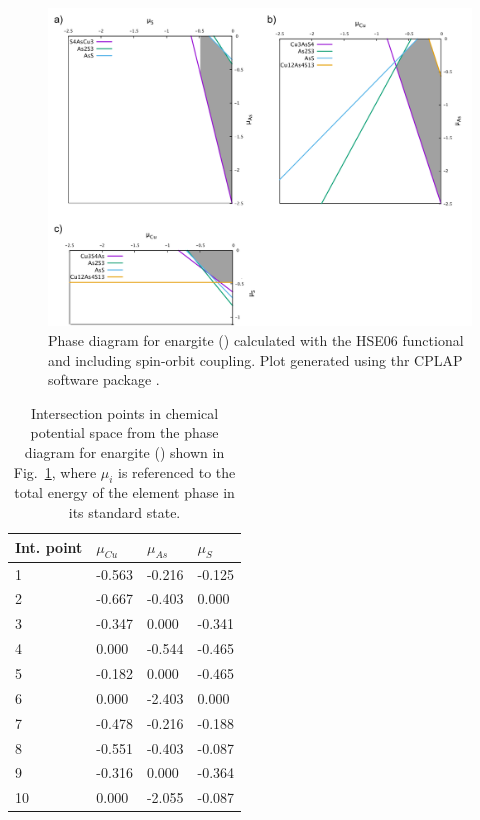 \documentclass[11pt, twoside]{report}
\begin{document}
\begin{figure}[h!]
    \centering
    \includegraphics[width=1.0\textwidth]{figures/enargite_p_d.png}
    \caption[Phase diagram for enargite ({\enargite}) calculated with the HSE06 functional and including spin-orbit coupling.]{Phase diagram for enargite ({\enargite}) calculated with the HSE06 functional and including spin-orbit coupling. Plot generated using thr CPLAP software package \cite{cplap}.}
    \label{enargite_p_d}
\end{figure}

\begin{table}[]
\begin{tabular}{@{}llll@{}}
\toprule
Int. point & $\mu_{Cu}$ & $\mu_{As}$ & $\mu_{S}$ \\ \midrule
1 & -0.563    & -0.216    & -0.125   \\
2 & -0.667    & -0.403    & 0.000    \\
3 & -0.347    & 0.000     & -0.341   \\
4 & 0.000     & -0.544    & -0.465   \\
5 & -0.182    & 0.000     & -0.465   \\
6 & 0.000     & -2.403    & 0.000    \\
7 & -0.478    & -0.216    & -0.188   \\
8 & -0.551    & -0.403    & -0.087   \\
9 & -0.316    & 0.000     & -0.364   \\
10 & 0.000     & -2.055    & -0.087   \\ \bottomrule
\end{tabular}
\caption{Intersection points in chemical potential space from the phase diagram for enargite ({\enargite}) shown in Fig.~\ref{enargite_p_d}, where $\mu_i$ is referenced to the total energy of the element phase in its standard state.}\label{enargite_int_points}
\end{table}
\end{document}
